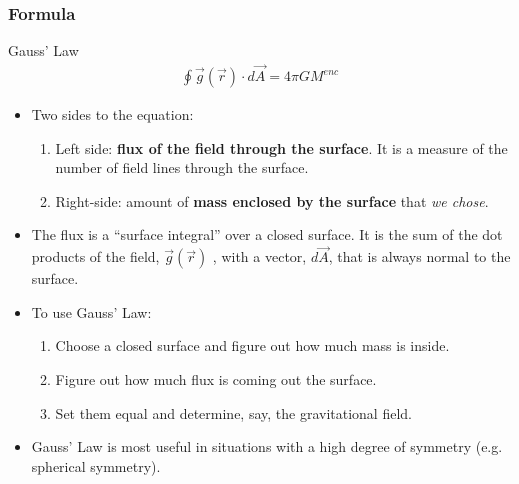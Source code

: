 \documentclass[aspectratio=169,
hyperref={colorlinks,urlcolor=blue}
]{beamer}
\begin{document}
\subsubsection{Formula}
\label{subsubsec:gaussformula}
\begin{frame}{Gauss' Law}
\begin{align*}
\oint \vec g(\vec r) \cdot d\vec A=4\pi G M^{enc}
\end{align*}

\begin{itemize}
\item Two sides to the equation:
\begin{enumerate}
\item Left side: \textbf{flux of the field through the surface}. It is a measure of the number of field lines through the surface.
\item Right-side: amount of \textbf{mass enclosed by the surface} that \textit{we chose}.
\end{enumerate}
\item The flux is a ``surface integral'' over a closed surface. It is the sum of the dot products of the field, $\vec g(\vec r)$ , with a vector, $d\vec A$, that is always normal to the surface.
\item To use Gauss' Law:
\begin{enumerate}
\item Choose a closed surface and figure out how much mass is inside.
\item Figure out how much flux is coming out the surface.
\item Set them equal and determine, say, the gravitational field.
\end{enumerate}
\item Gauss' Law is most useful in situations with a high degree of symmetry (e.g. spherical symmetry).
\end{itemize}
\end{frame}


\end{document}
